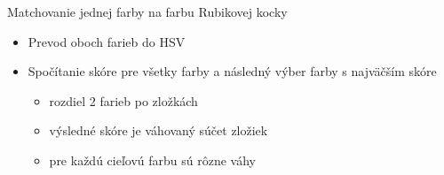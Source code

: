 \documentclass[red]{beamer}
\begin{document}
\begin{frame}{Matchovanie jednej farby na farbu Rubikovej kocky}
\begin{itemize}
\begin{textblock*}{4.5cm}(8.0cm,5.5cm)
\end{textblock*}
\item<1->Prevod oboch farieb do HSV
\item<2->Spočítanie skóre pre všetky farby a následný výber farby s najväčším skóre
    \begin{itemize}
    \item<3-> rozdiel 2 farieb po zložkách   
    \item<4-> výsledné skóre je váhovaný súčet zložiek
    \item<5-> pre každú cieľovú farbu sú rôzne váhy
    \end{itemize}
\end{itemize}
\end{frame}
\end{document}

